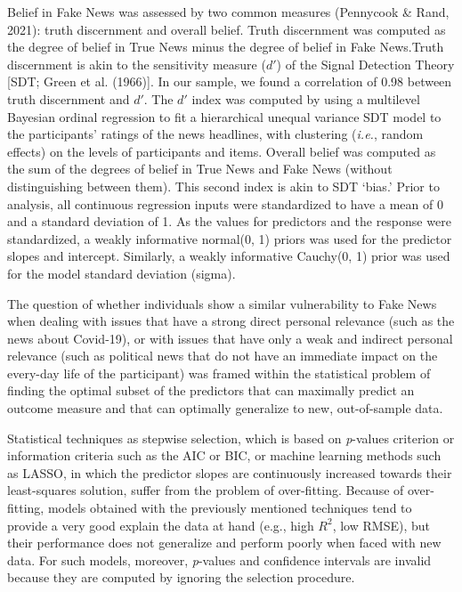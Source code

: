 \documentclass[
  english,
  man,floatsintext]{apa6}
\begin{document}
Belief in Fake News was assessed by two common measures (Pennycook \& Rand, 2021): truth discernment and overall belief. Truth discernment was computed as the degree of belief in True News minus the degree of belief in Fake News.Truth discernment is akin to the sensitivity measure (\(d'\)) of the Signal Detection Theory {[}SDT; Green et al. (1966){]}. In our sample, we found a correlation of 0.98 between truth discernment and \(d'\). The \(d'\) index was computed by using a multilevel Bayesian ordinal regression to fit a hierarchical unequal variance SDT model to the participants' ratings of the news headlines, with clustering (\emph{i.e.}, random effects) on the levels of participants and items. Overall belief was computed as the sum of the degrees of belief in True News and Fake News (without distinguishing between them). This second index is akin to SDT `bias.' Prior to analysis, all continuous regression inputs were standardized to have a mean of 0 and a standard deviation of 1. As the values for predictors and the response were standardized, a weakly informative normal(0, 1) priors was used for the predictor slopes and intercept. Similarly, a weakly informative Cauchy(0, 1) prior was used for the model standard deviation (sigma).

The question of whether individuals show a similar vulnerability to Fake News when dealing with issues that have a strong direct personal relevance (such as the news about Covid-19), or with issues that have only a weak and indirect personal relevance (such as political news that do not have an immediate impact on the every-day life of the participant) was framed within the statistical problem of finding the optimal subset of the predictors that can maximally predict an outcome measure and that can optimally generalize to new, out-of-sample data.

Statistical techniques as stepwise selection, which is based on \emph{p}-values criterion or information criteria such as the AIC or BIC, or machine learning methods such as LASSO, in which the predictor slopes are continuously increased towards their least-squares solution, suffer from the problem of over-fitting. Because of over-fitting, models obtained with the previously mentioned techniques tend to provide a very good explain the data at hand (e.g., high \(R^2\), low RMSE), but their performance does not generalize and perform poorly when faced with new data. For such models, moreover, \emph{p}-values and confidence intervals are invalid because they are computed by ignoring the selection procedure.
\end{document}
